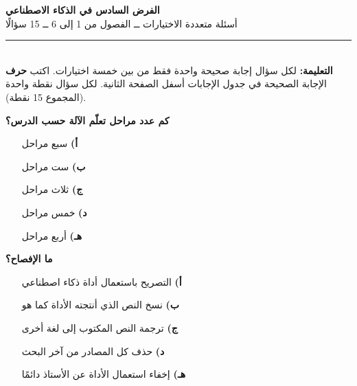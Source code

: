 \documentclass[11pt,a4paper]{article}
\begin{document}
\begin{center}
{\Large\khatt\textbf{الفرض السادس في الذكاء الاصطناعي}}\\[2pt]
{\normalsize أسئلة متعددة الاختيارات ــ الفصول من 1 إلى 6 ــ 15 سؤالًا}
\end{center}
\vspace{-4pt}\rule{\textwidth}{0.6pt}\\
{\small\textbf{التعليمة:} لكل سؤال إجابة صحيحة واحدة فقط من بين خمسة اختيارات.
اكتب \textbf{حرف} الإجابة الصحيحة في جدول الإجابات أسفل الصفحة الثانية.
لكل سؤال نقطة واحدة (المجموع 15 نقطة).}
\vspace{-2pt}
\begin{multicols}{2}

\noindent\begin{minipage}{\linewidth}
\hangindent=0.7cm\textbf{كم عدد مراحل تعلّم الآلة حسب الدرس؟}
\begin{itemize}[leftmargin=0.95cm, labelsep=4pt, itemsep=0pt, topsep=2pt, parsep=0pt]
  \item[\textbf{أ)}] سبع مراحل
  \item[\textbf{ب)}] ست مراحل
  \item[\textbf{ج)}] ثلاث مراحل
  \item[\textbf{د)}] خمس مراحل
  \item[\textbf{هـ)}] أربع مراحل
\end{itemize}
\end{minipage}\par\vspace{7pt plus 4pt}
\noindent\begin{minipage}{\linewidth}
\hangindent=0.7cm\textbf{ما الإفصاح؟}
\begin{itemize}[leftmargin=0.95cm, labelsep=4pt, itemsep=0pt, topsep=2pt, parsep=0pt]
  \item[\textbf{أ)}] التصريح باستعمال أداة ذكاء اصطناعي
  \item[\textbf{ب)}] نسخ النص الذي أنتجته الأداة كما هو
  \item[\textbf{ج)}] ترجمة النص المكتوب إلى لغة أخرى
  \item[\textbf{د)}] حذف كل المصادر من آخر البحث
  \item[\textbf{هـ)}] إخفاء استعمال الأداة عن الأستاذ دائمًا
\end{itemize}
\end{minipage}\par\vspace{7pt plus 4pt}

\end{multicols}
\end{document}
